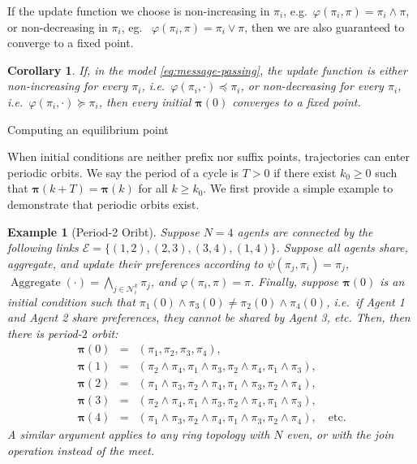 \documentclass[conference]{ieeeconf}
\newcommand{\N}{\mathcal{N}}
\newcommand{\join}{\vee}
\newcommand{\meet}{\wedge}
\newcommand{\bigmeet}{\bigwedge}
\renewcommand{\geq}{\geqslant}
\newcommand{\edges}{\mathcal{E}}
\DeclareMathOperator{\Aggregate}{Aggregate}
\newtheorem{corollary}{Corollary}
\newtheorem{example}{Example}
\begin{document}
If the update function we choose is non-increasing in $\pi_i$, e.g.~$\varphi(\pi_i,\pi) = \pi_i \meet \pi$, or non-decreasing in $\pi_i$, eg.~ $\varphi(\pi_i,\pi) = \pi_i \join \pi$, then we are also guaranteed to converge to a fixed point.

\begin{corollary}
    If, in the model \eqref{eq:message-passing}, the update function is either non-increasing for every $\pi_i$, i.e.~$\varphi(\pi_i,\cdot) \preceq \pi_i$, or non-decreasing for every $\pi_i$, i.e.~$\varphi(\pi_i,\cdot) \succeq \pi_i$, then every initial $\boldsymbol{\pi}(0)$ converges to a fixed point.
\end{corollary}

\begin{algorithm}[t]
\caption{Computing an equilibrium point} \label{alg:find-fixed}

\end{algorithm}


When initial conditions are neither prefix nor suffix points, trajectories can enter periodic orbits. We say the period of a cycle is $T>0$ if there exist $k_0 \geq 0$ such that $\boldsymbol{\pi}(k+T) = \boldsymbol{\pi}(k)$ for all $k \geq k_0$. We first provide a simple example to demonstrate that periodic orbits exist.

\begin{example}[Period-2 Oribt]
    Suppose $N = 4$ agents are connected by the following links $\edges = \{(1,2),(2,3),(3,4),(1,4)\}$. Suppose all agents share, aggregate, and update their preferences according to $\psi(\pi_j,\pi_i) = \pi_j$, $\Aggregate\left( \cdot \right) = \bigmeet_{j \in \N_i^k} \pi_j$, and $\varphi(\pi_i, \pi) = \pi$. Finally, suppose $\boldsymbol{\pi}(0)$ is an initial condition such that $\pi_1(0) \meet \pi_3(0) \neq \pi_2(0) \meet \pi_4(0)$, i.e.~if Agent 1 and Agent 2 share preferences, they cannot be shared by Agent 3, etc. Then, then there is period-$2$ orbit:
    \begin{align*}
        \boldsymbol{\pi}(0) &=& \left( \pi_1,\pi_2,\pi_3,\pi_4 \right), \\
        \boldsymbol{\pi}(1) &=& \left( \pi_2 \meet \pi_4, \pi_1 \meet \pi_3, \pi_2 \meet \pi_4, \pi_1 \meet \pi_3 \right), \\
        \boldsymbol{\pi}(2) &=& \left( \pi_1 \meet \pi_3, \pi_2 \meet \pi_4, \pi_1 \meet \pi_3, \pi_2 \meet \pi_4 \right), \\
        \boldsymbol{\pi}(3) &=& \left( \pi_2 \meet \pi_4, \pi_1 \meet \pi_3, \pi_2 \meet \pi_4, \pi_1 \meet \pi_3 \right), \\
        \boldsymbol{\pi}(4) &=& \left( \pi_1 \meet \pi_3, \pi_2 \meet \pi_4, \pi_1 \meet \pi_3, \pi_2 \meet \pi_4 \right), \quad \text{etc.}
    \end{align*}
    A similar argument applies to any ring topology with $N$ even, or with the join operation instead of the meet.

\end{example}
\end{document}
